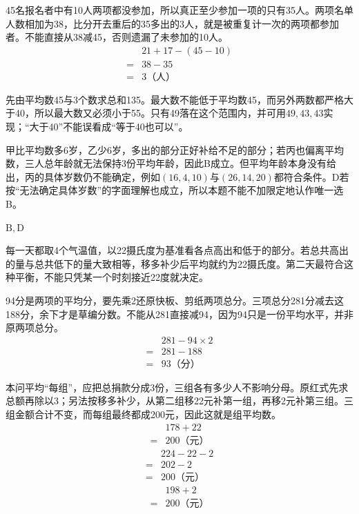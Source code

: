 \documentclass[multi=snippet,border=0pt]{standalone}
\newenvironment{snippet}[3]{\begin{minipage}{#1bp}\color{answerred}\fontsize{#2}{#3}\selectfont\raggedright}{\end{minipage}}
\begin{document}
\begin{snippet}{505}{11.5}{14}45名报名者中有10人两项都没参加，所以真正至少参加一项的只有35人。两项名单人数相加为38，比分开去重后的35多出的3人，就是被重复计一次的两项都参加者。不能直接从38减45，否则遗漏了未参加的10人。\[\begin{aligned}&21+17-(45-10)\\={}&38-35\\={}&3\text{（人）}\end{aligned}\]\end{snippet}
\begin{snippet}{505}{11.5}{14}先由平均数45与3个数求总和135。最大数不能低于平均数45，而另外两数都严格大于40，所以最大数又必须小于55。只有49落在这个范围内，并可用\(49,43,43\)实现；“大于40”不能误看成“等于40也可以”。\end{snippet}
\begin{snippet}{505}{11.5}{14}甲比平均数多6岁，乙少6岁，多出的部分正好补给不足的部分；若丙也偏离平均数，三人总年龄就无法保持3份平均年龄，因此B成立。但平均年龄本身没有给出，丙的具体岁数仍不能确定，例如\((16,4,10)\)与\((26,14,20)\)都符合条件。D若按“无法确定具体岁数”的字面理解也成立，所以本题不能不加限定地认作唯一选B。\end{snippet}
\begin{snippet}{22}{11.5}{12.8}\(\mathrm{B,D}\)\end{snippet}
\begin{snippet}{505}{11.5}{14}每一天都取4个气温值，以22摄氏度为基准看各点高出和低于的部分。若总共高出的量与总共低下的量大致相等，移多补少后平均就约为22摄氏度。第二天最符合这种平衡，不能只凭某一个时刻接近22度就决定。\end{snippet}
\begin{snippet}{505}{11.5}{14}94分是两项的平均分，要先乘2还原快板、剪纸两项总分。三项总分281分减去这188分，余下才是草编分数。不能从281直接减94，因为94只是一份平均水平，并非原两项总分。\[\begin{aligned}&281-94\times2\\={}&281-188\\={}&93\text{（分）}\end{aligned}\]\end{snippet}
\begin{snippet}{505}{11.5}{14}本问平均“每组”，应把总捐款分成3份，三组各有多少人不影响分母。原红式先求总额再除以3；另法按移多补少，从第二组移22元补第一组，再移2元补第三组。三组金额合计不变，而每组最终都成200元，因此这就是组平均数。\[\begin{aligned}&178+22\\={}&200\text{（元）}\end{aligned}\]\[\begin{aligned}&224-22-2\\={}&202-2\\={}&200\text{（元）}\end{aligned}\]\[\begin{aligned}&198+2\\={}&200\text{（元）}\end{aligned}\]\end{snippet}
\end{document}
